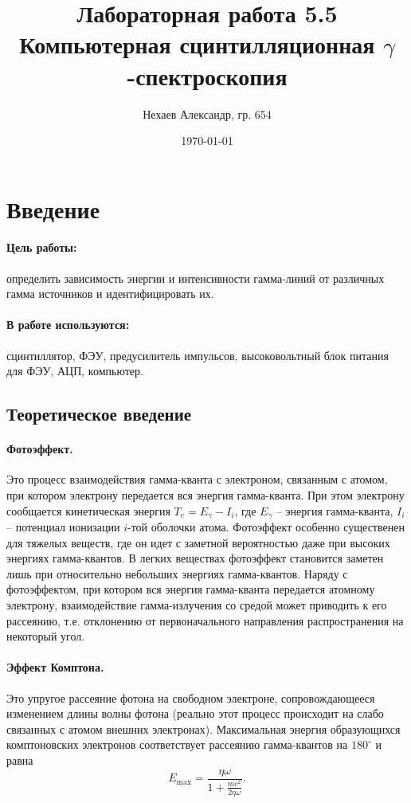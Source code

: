 \documentclass[a4paper, 12pt]{article}
\title{Лабораторная работа 5.5\\Компьютерная сцинтилляционная $\gamma$-спектроскопия}
\author{Нехаев Александр, гр. 654}
\date{\today}
\begin{document}
\maketitle
\tableofcontents
\section{Введение}
\paragraph{Цель работы:}
определить зависимость энергии и интенсивности гамма-линий от различных гамма источников и идентифицировать их.
\paragraph{В работе используются:}
сцинтиллятор, ФЭУ, предусилитель импульсов, высоковольтный блок питания для ФЭУ, АЦП, компьютер.
\subsection{Теоретическое введение}
\paragraph{Фотоэффект.}
Это процесс взаимодействия гамма-кванта с электроном, связанным с атомом, при котором электрону передается вся энергия гамма-кванта. При этом электрону сообщается кинетическая энергия $T_e=E_\gamma-I_i$, где $E_\gamma$ -- энергия гамма-кванта, $I_i$ -- потенциал ионизации $i$-той оболочки атома. Фотоэффект особенно существенен для тяжелых веществ, где он идет с заметной вероятностью даже при высоких энергиях гамма-квантов. В легких веществах фотоэффект становится заметен лишь при относительно небольших энергиях гамма-квантов. Наряду с фотоэффектом, при котором вся энергия гамма-кванта передается атомному электрону, взаимодействие гамма-излучения со средой может приводить к его рассеянию, т.е. отклонению от первоначального направления распространения на некоторый угол.
\paragraph{Эффект Комптона.} Это упругое рассеяние фотона на свободном электроне, сопровождающееся изменением длины волны фотона (реально этот процесс происходит на слабо связанных с атомом внешних электронах). Максимальная энергия образующихся комптоновских электронов соответствует рассеянию гамма-квантов на $180^\circ$ и равна
\begin{equation}
E_{\max}=\frac{\eta\omega}{1+\frac{mc^2}{2\eta\omega}}.
\end{equation}
\end{document}
